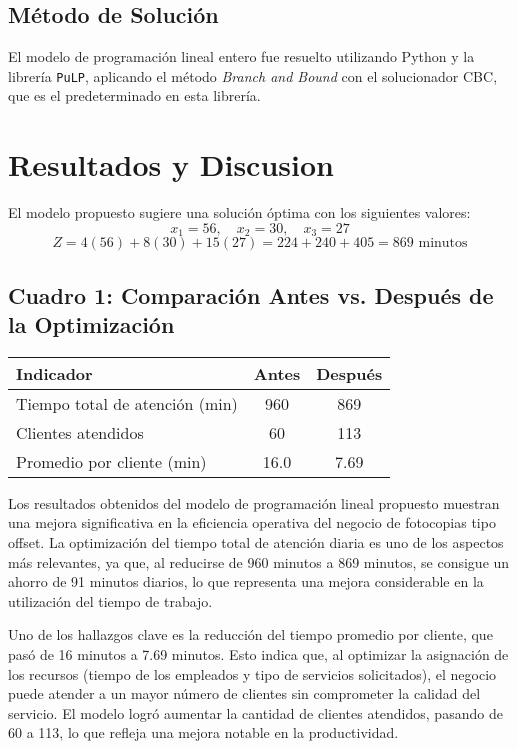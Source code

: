 \documentclass[12pt]{article}
\begin{document}
\subsection{Método de Solución}

El modelo de programación lineal entero fue resuelto utilizando Python y la librería \texttt{PuLP}, aplicando el método \textit{Branch and Bound} con el solucionador CBC, que es el predeterminado en esta librería.

\section{Resultados y Discusion}
El modelo propuesto sugiere una solución óptima con los siguientes valores:
\[
x_1 = 56, \quad x_2 = 30, \quad x_3 = 27
\]
\[
Z = 4(56) + 8(30) + 15(27) = 224 + 240 + 405 = 869 \text{ minutos}
\]

\subsection*{Cuadro 1: Comparación Antes vs. Después de la Optimización}

\begin{center}
\begin{tabular}{lcc}
\toprule
\textbf{Indicador} & \textbf{Antes} & \textbf{Después} \\
\midrule
Tiempo total de atención (min) & 960 & 869 \\
Clientes atendidos & 60 & 113 \\
Promedio por cliente (min) & 16.0 & 7.69 \\
\bottomrule
\end{tabular}
\end{center}
Los resultados obtenidos del modelo de programación lineal propuesto muestran una mejora significativa en la eficiencia operativa del negocio de fotocopias tipo offset. La optimización del tiempo total de atención diaria es uno de los aspectos más relevantes, ya que, al reducirse de 960 minutos a 869 minutos, se consigue un ahorro de 91 minutos diarios, lo que representa una mejora considerable en la utilización del tiempo de trabajo.

Uno de los hallazgos clave es la reducción del tiempo promedio por cliente, que pasó de 16 minutos a 7.69 minutos. Esto indica que, al optimizar la asignación de los recursos (tiempo de los empleados y tipo de servicios solicitados), el negocio puede atender a un mayor número de clientes sin comprometer la calidad del servicio. El modelo logró aumentar la cantidad de clientes atendidos, pasando de 60 a 113, lo que refleja una mejora notable en la productividad.
\end{document}
